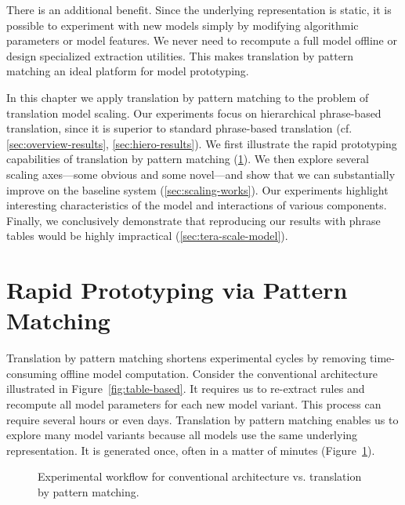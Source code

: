 There is an additional benefit. Since
the underlying representation is static, it is possible
to experiment with new models simply by modifying algorithmic
parameters or model features.  We never need to recompute a 
full model offline or design specialized extraction utilities.
This makes translation by pattern matching an ideal platform
for model prototyping.

In this chapter we apply translation by pattern matching to the
problem of translation model scaling.  Our experiments focus on
hierarchical phrase-based translation,
since it is superior to standard phrase-based translation 
(cf. \textsection\ref{sec:overview-results}, \textsection\ref{sec:hiero-results}).
We first illustrate the rapid prototyping capabilities of translation
by pattern matching (\textsection\ref{sec:prototyping}).
We then explore several scaling axes---some obvious and 
some novel---and show that we can substantially improve on 
the baseline system (\textsection\ref{sec:scaling-works}).  Our
experiments highlight interesting characteristics of the model
and interactions of various components.
Finally, we conclusively demonstrate that reproducing our results
with phrase tables would be highly impractical
(\textsection\ref{sec:tera-scale-model}).

\section{Rapid Prototyping via Pattern Matching}\label{sec:prototyping}

Translation by pattern matching shortens
experimental cycles by removing time-consuming offline model computation.
Consider the conventional architecture illustrated in Figure~\ref{fig:table-based}.
It requires us to re-extract rules and recompute
all model parameters for each new model variant. This process can
require several hours or even days.  Translation 
by pattern matching enables us to explore many model variants
because all models use the same underlying representation. 
It is generated once, often in a matter of minutes
(Figure~\ref{fig:prototyping}).

\figpreamble
\begin{figure}
	\figfontsize{
	\begin{center}
		
	\end{center}}
	\figpostamble
	\label{fig:prototyping}
	\caption{Experimental workflow for conventional architecture vs. translation by pattern matching.}
\end{figure}


